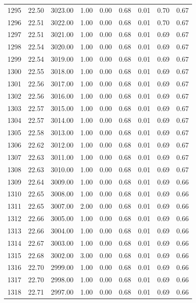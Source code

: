 \documentclass{article}\usepackage[]{graphicx}\usepackage[]{color}
\begin{document}
\begin{longtable}{rrrrrrrrr}
  1295 & 22.50 & 3023.00 & 1.00 & 0.00 & 0.68 & 0.01 & 0.70 & 0.67 \\ 
  1296 & 22.51 & 3022.00 & 1.00 & 0.00 & 0.68 & 0.01 & 0.70 & 0.67 \\ 
  1297 & 22.51 & 3021.00 & 1.00 & 0.00 & 0.68 & 0.01 & 0.69 & 0.67 \\ 
  1298 & 22.54 & 3020.00 & 1.00 & 0.00 & 0.68 & 0.01 & 0.69 & 0.67 \\ 
  1299 & 22.54 & 3019.00 & 1.00 & 0.00 & 0.68 & 0.01 & 0.69 & 0.67 \\ 
  1300 & 22.55 & 3018.00 & 1.00 & 0.00 & 0.68 & 0.01 & 0.69 & 0.67 \\ 
  1301 & 22.56 & 3017.00 & 1.00 & 0.00 & 0.68 & 0.01 & 0.69 & 0.67 \\ 
  1302 & 22.56 & 3016.00 & 1.00 & 0.00 & 0.68 & 0.01 & 0.69 & 0.67 \\ 
  1303 & 22.57 & 3015.00 & 1.00 & 0.00 & 0.68 & 0.01 & 0.69 & 0.67 \\ 
  1304 & 22.57 & 3014.00 & 1.00 & 0.00 & 0.68 & 0.01 & 0.69 & 0.67 \\ 
  1305 & 22.58 & 3013.00 & 1.00 & 0.00 & 0.68 & 0.01 & 0.69 & 0.67 \\ 
  1306 & 22.62 & 3012.00 & 1.00 & 0.00 & 0.68 & 0.01 & 0.69 & 0.67 \\ 
  1307 & 22.63 & 3011.00 & 1.00 & 0.00 & 0.68 & 0.01 & 0.69 & 0.67 \\ 
  1308 & 22.63 & 3010.00 & 1.00 & 0.00 & 0.68 & 0.01 & 0.69 & 0.67 \\ 
  1309 & 22.64 & 3009.00 & 1.00 & 0.00 & 0.68 & 0.01 & 0.69 & 0.66 \\ 
  1310 & 22.65 & 3008.00 & 1.00 & 0.00 & 0.68 & 0.01 & 0.69 & 0.66 \\ 
  1311 & 22.65 & 3007.00 & 2.00 & 0.00 & 0.68 & 0.01 & 0.69 & 0.66 \\ 
  1312 & 22.66 & 3005.00 & 1.00 & 0.00 & 0.68 & 0.01 & 0.69 & 0.66 \\ 
  1313 & 22.66 & 3004.00 & 1.00 & 0.00 & 0.68 & 0.01 & 0.69 & 0.66 \\ 
  1314 & 22.67 & 3003.00 & 1.00 & 0.00 & 0.68 & 0.01 & 0.69 & 0.66 \\ 
  1315 & 22.68 & 3002.00 & 3.00 & 0.00 & 0.68 & 0.01 & 0.69 & 0.66 \\ 
  1316 & 22.70 & 2999.00 & 1.00 & 0.00 & 0.68 & 0.01 & 0.69 & 0.66 \\ 
  1317 & 22.70 & 2998.00 & 1.00 & 0.00 & 0.68 & 0.01 & 0.69 & 0.66 \\ 
  1318 & 22.71 & 2997.00 & 1.00 & 0.00 & 0.68 & 0.01 & 0.69 & 0.66 \\ 

\end{longtable}
\end{document}
